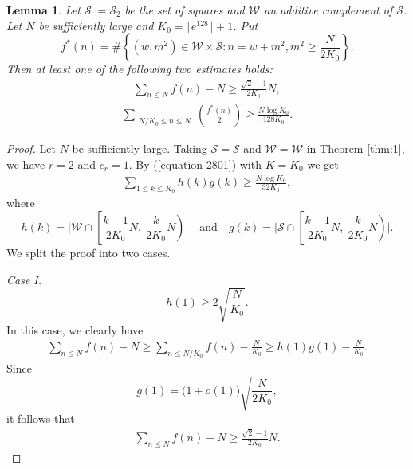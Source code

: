 \documentclass[12pt,a4paper,reqno]{amsart}
\numberwithin{equation}{section}
\theoremstyle{plain}
\newtheorem{lemma}{Lemma}
\theoremstyle{definition}
\begin{document}
\begin{lemma}\label{Lemma-restricted}
Let $\mathcal{S}:=\mathcal{S}_2$ be the set of squares and $\mathcal{W}$ an additive complement of $\mathcal{S}$. Let $N$ be sufficiently large and $K_0=\lfloor e^{128}\rfloor+1$. Put
$$
f^*(n)=\#\left\{(w, m^2)\in \mathcal{W}\times\mathcal{S}: n=w+m^2, m^2\ge \frac{N}{2K_0}\right\}.
$$
Then at least one of the following two estimates holds:
\begin{align}\label{first-moment}
\sum_{n\le N}f(n)-N\ge \frac{\sqrt{2}-1}{2K_0}N,
\end{align}
\begin{align*}
\sum_{\substack{N/K_0\leq n \leq N}}\binom{f^*(n)}{2}\ge \frac{N\log K_0}{128K_0}.
\end{align*}
\end{lemma}
\begin{proof}
Let $N$ be sufficiently large.
Taking $\mathscr{S}=\mathcal{S}$ and $\mathscr{W}=\mathcal{W}$ in Theorem \ref{thm:1}, we have $r=2$ and $c_r=1$.
By (\ref{equation-2801}) with $K=K_0$ we get
\begin{align}\label{eq-0322-1}
\sum_{1\le k\le K_0}h(k)g(k)\ge \frac{N\log K_0}{32K_0},
\end{align}
where
$$
h(k)=\bigg|\mathcal{W}\cap\left[\frac{k-1}{2K_0}N,\ \frac{k}{2K_0}N\right)\bigg| \quad \text{and} \quad g(k)=\bigg|\mathcal{S}\cap\left[\frac{k-1}{2K_0}N,\ \frac{k}{2K_0}N\right)\bigg|.
$$
We split the proof into two cases.

{\it Case I.} 
$$
h(1)\ge 2\sqrt{\frac{N}{K_0}}.
$$
In this case, we clearly have
\begin{align*}
    \sum_{n\le N}f(n)-N\ge \sum_{n\le N/K_0}f(n)-\frac{N}{K_0}\ge h(1)g(1)-\frac{N}{K_0}.
\end{align*}
Since 
$$
g(1)=\big(1+o(1)\big)\sqrt{\frac{N}{2K_0}},
$$
it follows that
\begin{align*}
    \sum_{n\le N}f(n)-N
    \ge \frac{\sqrt{2}-1}{2K_0}N.
\end{align*}


\end{proof}
\end{document}
